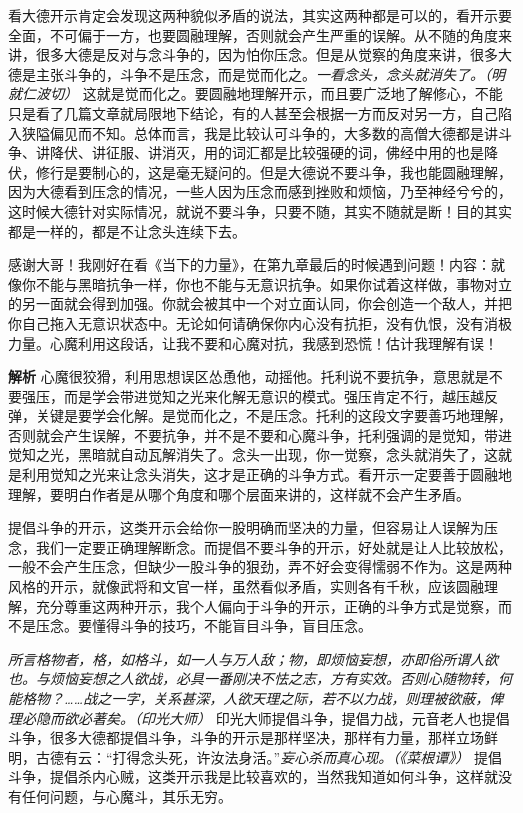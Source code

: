 看大德开示肯定会发现这两种貌似矛盾的说法，其实这两种都是可以的，看开示要全面，不可偏于一方，也要圆融理解，否则就会产生严重的误解。从不随的角度来讲，很多大德是反对与念斗争的，因为怕你压念。但是从觉察的角度来讲，很多大德是主张斗争的，斗争不是压念，而是觉而化之。\textit{一看念头，念头就消失了。（明就仁波切）} 这就是觉而化之。要圆融地理解开示，而且要广泛地了解修心，不能只是看了几篇文章就局限地下结论，有的人甚至会根据一方而反对另一方，自己陷入狭隘偏见而不知。总体而言，我是比较认可斗争的，大多数的高僧大德都是讲斗争、讲降伏、讲征服、讲消灭，用的词汇都是比较强硬的词，佛经中用的也是降伏，修行是要制心的，这是毫无疑问的。但是大德说不要斗争，我也能圆融理解，因为大德看到压念的情况，一些人因为压念而感到挫败和烦恼，乃至神经兮兮的，这时候大德针对实际情况，就说不要斗争，只要不随，其实不随就是断！目的其实都是一样的，都是不让念头连续下去。

\begin{case}[两种开示的圆融理解]
    感谢大哥！我刚好在看《当下的力量》，在第九章最后的时候遇到问题！内容：就像你不能与黑暗抗争一样，你也不能与无意识抗争。如果你试着这样做，事物对立的另一面就会得到加强。你就会被其中一个对立面认同，你会创造一个敌人，并把你自己拖入无意识状态中。无论如何请确保你内心没有抗拒，没有仇恨，没有消极力量。心魔利用这段话，让我不要和心魔对抗，我感到恐慌！估计我理解有误！

    \textbf{解析} 心魔很狡猾，利用思想误区怂恿他，动摇他。托利说不要抗争，意思就是不要强压，而是学会带进觉知之光来化解无意识的模式。强压肯定不行，越压越反弹，关键是要学会化解。是觉而化之，不是压念。托利的这段文字要善巧地理解，否则就会产生误解，不要抗争，并不是不要和心魔斗争，托利强调的是觉知，带进觉知之光，黑暗就自动瓦解消失了。念头一出现，你一觉察，念头就消失了，这就是利用觉知之光来让念头消失，这才是正确的斗争方式。看开示一定要善于圆融地理解，要明白作者是从哪个角度和哪个层面来讲的，这样就不会产生矛盾。
\end{case}

提倡斗争的开示，这类开示会给你一股明确而坚决的力量，但容易让人误解为压念，我们一定要正确理解断念。而提倡不要斗争的开示，好处就是让人比较放松，一般不会产生压念，但缺少一股斗争的狠劲，弄不好会变得懦弱不作为。这是两种风格的开示，就像武将和文官一样，虽然看似矛盾，实则各有千秋，应该圆融理解，充分尊重这两种开示，我个人偏向于斗争的开示，正确的斗争方式是觉察，而不是压念。要懂得斗争的技巧，不能盲目斗争，盲目压念。

\textit{所言格物者，格，如格斗，如一人与万人敌；物，即烦恼妄想，亦即俗所谓人欲也。与烦恼妄想之人欲战，必具一番刚决不怯之志，方有实效。否则心随物转，何能格物？……战之一字，关系甚深，人欲天理之际，若不以力战，则理被欲蔽，俾理必隐而欲必著矣。（印光大师）} 印光大师提倡斗争，提倡力战，元音老人也提倡斗争，很多大德都提倡斗争，斗争的开示是那样坚决，那样有力量，那样立场鲜明，古德有云：“打得念头死，许汝法身活。”\textit{妄心杀而真心现。（《菜根谭》）} 提倡斗争，提倡杀内心贼，这类开示我是比较喜欢的，当然我知道如何斗争，这样就没有任何问题，与心魔斗，其乐无穷。

